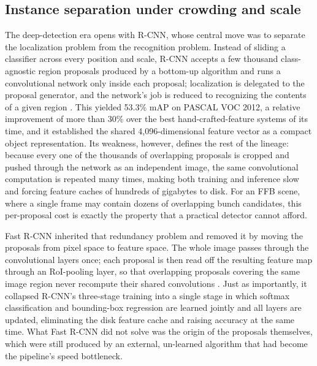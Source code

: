 \subsection{Instance separation under crowding and scale}

The deep-detection era opens with R-CNN, whose central move was to separate the localization problem from the recognition problem. Instead of sliding a classifier across every position and scale, R-CNN accepts a few thousand class-agnostic region proposals produced by a bottom-up algorithm and runs a convolutional network only inside each proposal; localization is delegated to the proposal generator, and the network's job is reduced to recognizing the contents of a given region \cite{girshick2014rcnn}. This yielded 53.3\% mAP on PASCAL VOC 2012, a relative improvement of more than 30\% over the best hand-crafted-feature systems of its time, and it established the shared 4{,}096-dimensional feature vector as a compact object representation. Its weakness, however, defines the rest of the lineage: because every one of the thousands of overlapping proposals is cropped and pushed through the network as an independent image, the same convolutional computation is repeated many times, making both training and inference slow and forcing feature caches of hundreds of gigabytes to disk. For an FFB scene, where a single frame may contain dozens of overlapping bunch candidates, this per-proposal cost is exactly the property that a practical detector cannot afford.

Fast R-CNN inherited that redundancy problem and removed it by moving the proposals from pixel space to feature space. The whole image passes through the convolutional layers once; each proposal is then read off the resulting feature map through an RoI-pooling layer, so that overlapping proposals covering the same image region never recompute their shared convolutions \cite{girshick2015fastrcnn}. Just as importantly, it collapsed R-CNN's three-stage training into a single stage in which softmax classification and bounding-box regression are learned jointly and all layers are updated, eliminating the disk feature cache and raising accuracy at the same time. What Fast R-CNN did not solve was the origin of the proposals themselves, which were still produced by an external, un-learned algorithm that had become the pipeline's speed bottleneck.

